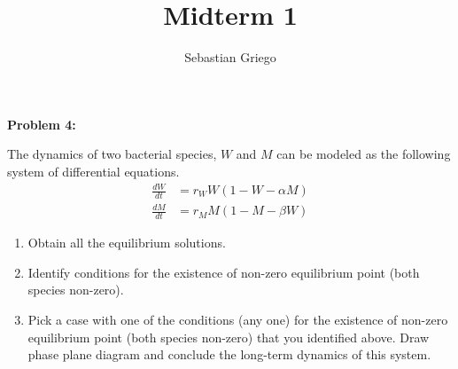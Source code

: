 \documentclass[12pt]{article}
\newenvironment{problem}[1]{
    \textbf{Problem #1:}
}{
    \rmfamily \vspace{1em}
}
\begin{document}
\title{Midterm 1}  %
\author{Sebastian Griego}  %


\begin{problem}{4}
    The dynamics of two bacterial species, \(W\) and \(M\) can be modeled as the following system of differential equations.
    \[
    \begin{aligned}
    \frac{dW}{dt} &= r_W W(1 - W - \alpha M) \\
    \frac{dM}{dt} &= r_M M(1 - M - \beta W)
    \end{aligned}
    \]
    \begin{enumerate}
        \item  Obtain all the equilibrium solutions.
        \item Identify conditions for the existence of non-zero equilibrium point (both species non-zero).
        \item Pick a case with one of the conditions (any one) for the existence of non-zero equilibrium point (both species non-zero) that you identified above. Draw phase plane diagram and conclude the long-term dynamics of this system.
    \end{enumerate}
\end{problem}
\end{document}
